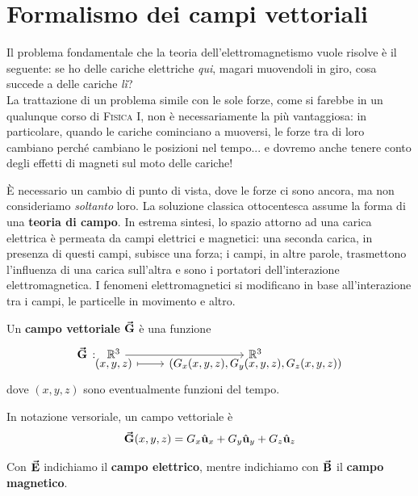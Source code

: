 \section{Formalismo dei campi vettoriali}
Il problema fondamentale che la teoria dell'elettromagnetismo vuole risolve è il seguente: se ho delle cariche elettriche \textit{qui}, magari muovendoli in giro, cosa succede a delle cariche \textit{lì}?\\
La trattazione di un problema simile con le sole forze, come si farebbe in un qualunque corso di \textsc{Fisica I}, non è necessariamente la più vantaggiosa: in particolare, quando le cariche cominciano a muoversi, le forze tra di loro cambiano perché cambiano le posizioni nel tempo... e dovremo anche tenere conto degli effetti di magneti sul moto delle cariche!

È necessario un cambio di punto di vista, dove le forze ci sono ancora, ma non consideriamo \textit{soltanto} loro. La soluzione classica ottocentesca assume la forma di una \textbf{teoria di campo}. In estrema sintesi, lo spazio attorno ad una carica elettrica è permeata da campi elettrici e magnetici: una seconda carica, in presenza di questi campi, subisce una forza; i campi, in altre parole, trasmettono l'influenza di una carica sull'altra e sono i portatori dell'interazione elettromagnetica. I fenomeni elettromagnetici si modificano in base all'interazione tra i campi, le particelle in movimento e altro.
\begin{define}
	Un \textbf{campo vettoriale} $\vb*{\va{G}}$ è una funzione
	\begin{equation}
		\funztot[\vba{G}]{\realset^3}{\realset^3}{(x,y,z)}{(G_x(x,y,z),G_y(x,y,z),G_z(x,y,z))}
	\end{equation}
dove $(x,y,z)$ sono eventualmente funzioni del tempo.
\end{define}
\begin{notate}
	In notazione versoriale, un campo vettoriale è
	\begin{equation}
		\vb*{\va{G}}(x,y,z)=G_x\hat{\mathbf{u}}_x+G_y\hat{\mathbf{u}}_y+G_z\hat{\mathbf{u}}_z
	\end{equation}
\end{notate}
\begin{observe}
	Con $\vb*{\va{E}}$ indichiamo il \textbf{campo elettrico}, mentre indichiamo con $\vb*{\va{B}}$ il \textbf{campo magnetico}.
\end{observe}
